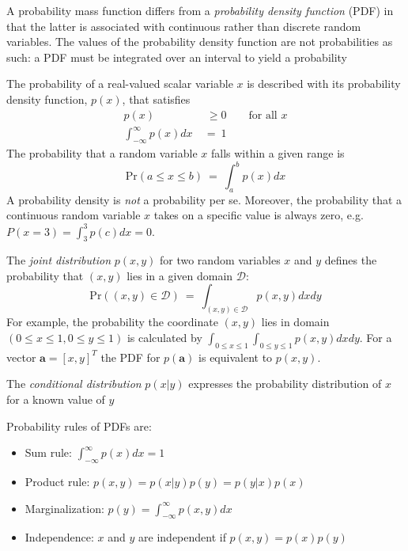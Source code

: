 \documentclass[11pt]{article}
\theoremstyle{plain}
\theoremstyle{definition}
\begin{document}
A probability mass function differs from a \textit{probability density function} (PDF) in that the latter is associated with continuous rather than discrete random variables. The values of the probability density function are not probabilities as such: a PDF must be integrated over an interval to yield a probability

The probability of a real-valued scalar variable $x$ is described with its probability density function, $p(x)$, that satisfies
\begin{align}
p(x) \  & \ \geq 0 \qquad \text{for all $x$} \\
\int_{-\infty}^{\infty} p(x) dx \ &= \ 1
\end{align}
The probability that a random variable $x$ falls within a given range is
\begin{equation}
\text{Pr}(a \leq x \leq b) \ = \ \int_{a}^{b}p(x)dx
\end{equation}
A probability density is \textit{not} a probability per se. Moreover, the probability that a continuous random variable $x$ takes on a specific value is always zero, e.g. $P(x=3) = \int_3^3p(c)dx=0$.

The \textit{joint distribution} $p(x,y)$ for two random variables $x$ and $y$ defines the probability that $(x,y)$ lies in a given domain $\mathcal{D}$:
\begin{equation}
\text{Pr}((x,y) \in \mathcal{D}) \ = \ \int_{(x,y)\in \mathcal{D}} p(x,y)dxdy
\end{equation}
For example, the probability the coordinate $(x,y)$ lies in domain $(0\leq x \leq 1,0\leq y\leq 1)$ is calculated by $\int_{0\leq x \leq 1} \int_{0\leq y \leq 1}p(x,y)dxdy$. For a vector $\textbf{a} = \left[x,y\right]^T$ the PDF for $p(\textbf{a})$ is equivalent to $p(x,y)$.

The \textit{conditional distribution} $p(x|y)$ expresses the probability distribution of $x$ for a known value of $y$

Probability rules of PDFs are:
\begin{itemize}
	\item Sum rule: $\int_{-\infty}^{\infty}p(x)dx=1$
	\item Product rule: $p(x,y) = p(x|y)p(y)=p(y|x)p(x)$
	\item Marginalization: $p(y) = \int_{-\infty}^{\infty} p(x,y) dx$
	\item Independence: $x$ and $y$ are independent if $p(x,y)=p(x)p(y)$
\end{itemize}
\end{document}
